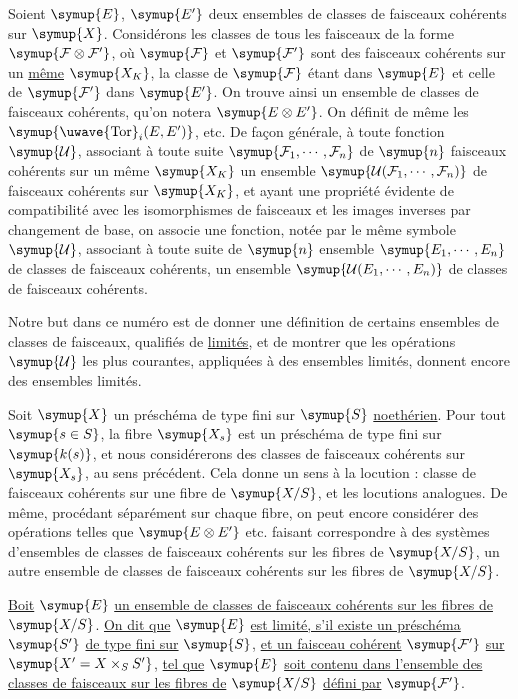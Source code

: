 Soient $\symup{E}$, $\symup{E'}$ deux ensembles de classes de faisceaux cohérents sur $\symup{X}$.
Considérons les classes de tous les faisceaux de la forme
$\symup{\mathcal F\otimes\mathcal F'}$, où $\symup{\mathcal F}$ et $\symup{\mathcal F'}$ sont des
faisceaux cohérents sur un \uline{même} $\symup{X_K}$, la classe de $\symup{\mathcal F}$ étant dans
$\symup{E}$ et celle de $\symup{\mathcal F'}$ dans $\symup{E'}$. On trouve ainsi un ensemble de
classes de faisceaux cohérents, qu'on notera $\symup{E\otimes E'}$. On définit de même
les $\symup{\mathop{\text{\uwave{Tor}}}\nolimits_i(E,E')}$, etc. De façon générale, à toute fonction
$\symup{\mathcal U}$, associant à toute suite $\symup{\mathcal F_1,\cdots,\mathcal F_n}$ de $\symup{n}$
faisceaux cohérents sur un même $\symup{X_K}$ un ensemble
$\symup{\mathcal U(\mathcal F_1,\cdots,\mathcal F_n)}$ de faisceaux cohérents sur $\symup{X_K}$, et
ayant une propriété évidente de compatibilité avec les isomorphismes de
faisceaux et les images inverses par changement de base, on associe une
fonction, notée par le même symbole $\symup{\mathcal U}$, associant à toute suite de $\symup{n}$
ensemble $\symup{E_1,\cdots,E_n}$ de classes de faisceaux cohérents, un ensemble
$\symup{\mathcal U(E_1,\cdots,E_n)}$ de classes de faisceaux cohérents.

Notre but dans ce numéro est de donner une définition de certains ensembles de
classes de faisceaux, qualifiés de \uline{limités}, et de montrer que les
opérations $\symup{\mathcal U}$ les plus courantes, appliquées à des ensembles limités, donnent
encore des ensembles limités.

Soit $\symup{X}$ un préschéma de type fini sur $\symup{S}$ \uline{noethérien}. Pour tout $\symup{s\in S}$, la
fibre $\symup{X_s}$ est un préschéma de type fini sur $\symup{k(s)}$, et nous considérerons des
classes de faisceaux cohérents sur $\symup{X_s}$, au sens précédent. Cela donne un sens
à la locution : classe de faisceaux cohérents sur une fibre de $\symup{X/S}$, et les
locutions analogues. De même, procédant séparément sur chaque fibre, on peut
encore considérer des opérations telles que $\symup{E\otimes E'}$ etc. faisant
correspondre à des systèmes d'ensembles de
classes de faisceaux cohérents sur les fibres de $\symup{X/S}$, un autre ensemble de
classes de faisceaux cohérents sur les fibres de $\symup{X/S}$.

 \uline{Boit} $\symup{E}$ \uline{un ensemble de classes de faisceaux cohérents
sur les fibres de} $\symup{X/S}$. \uline{On dit que} $\symup{E}$ \uline{est limité, s'il existe un
préschéma} $\symup{S'}$ \uline{de type fini sur} $\symup{S}$, \uline{et un faisceau cohérent} $\symup{\mathcal F'}$ \uline{sur}
$\symup{X'=X\times_S S'}$, \uline{tel que} $\symup{E}$ \uline{soit contenu dans l'ensemble des classes de
faisceaux sur les fibres de} $\symup{X/S}$ \uline{défini par} $\symup{\mathcal F'}$.


